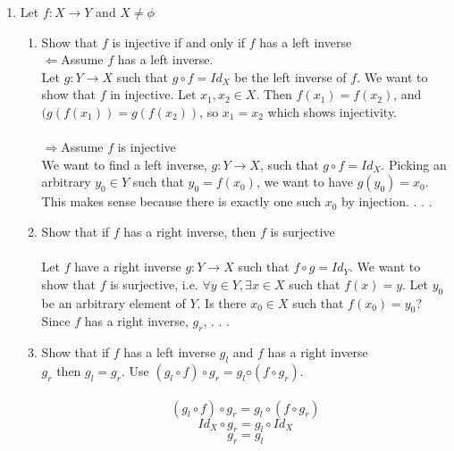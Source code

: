 \documentclass[11pt]{article}
\begin{document}
\begin{enumerate}
\item Let $f:X \to Y$ and $X \neq \phi$
\begin{enumerate}
\item Show that $f$ is injective if and only if $f$ has a left inverse\\
$\Leftarrow$Assume $f$ has a left inverse.\\
Let $g : Y \to X$ such that $g \circ f = Id_X$ be the left inverse of $f$.  We want to show that $f$ in injective.  Let $x_1, x_2 \in X$.  Then $f(x_1) = f(x_2)$, and $(g(f(x_1)) = g(f(x_2))$, so $x_1 = x_2$ which shows injectivity.\\\\
$\Rightarrow$Assume $f$ is injective\\
We want to find a left inverse, $g : Y \to X$, such that $g \circ f = Id_X$.  Picking an arbitrary $y_0 \in Y$ such that $y_0 = f(x_0)$, we want to have $g(y_0) = x_0$. This makes sense because there is exactly one such $x_0$ by injection. . . .
\item Show that if $f$ has a right inverse, then $f$ is surjective\\\\
Let $f$ have a right inverse $g : Y \to X$ such that  $f \circ g = Id_Y$.  We want to show that $f$ is surjective, i.e. $\forall y \in Y, \exists x \in X$ such that $f(x) = y$.  Let $y_0$ be an arbitrary element of $Y$.  Is there $x_0 \in X$ such that $f(x_0) = y_0$?  Since $f$ has a right inverse, $g_r$, . . .
\\
\item Show that if $f$ has a left inverse $g_l$ and $f$ has a right inverse\\
$g_r$ then $g_l = g_r$. Use $(g_l \circ f) \circ g_r = g_l ◦ (f \circ g_r )$.\\
\\
$$(g_l \circ f) \circ g_r = g_l \circ (f \circ g_r)$$
$$Id_X \circ g_r = g_l \circ Id_X$$
$$g_r = g_l$$
\end{enumerate} %


\end{enumerate}
\end{document}
